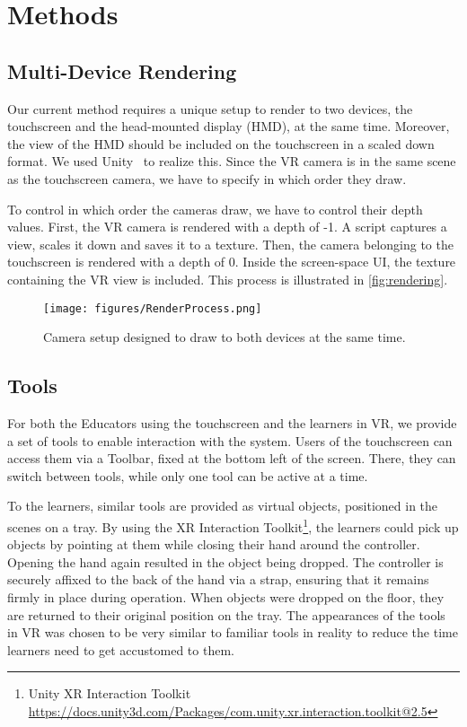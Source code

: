 \section{Methods}

\subsection{Multi-Device Rendering}

Our current method requires a unique setup to render to two devices, the touchscreen and the head-mounted display (HMD), at the same time. Moreover, the view of the HMD should be included on the touchscreen in a scaled down format. We used Unity~\cite{unity} to realize this. Since the VR camera is in the same scene as the touchscreen camera, we have to specify in which order they draw.

To control in which order the cameras draw, we have to control their depth values. First, the VR camera is rendered with a depth of -1. A script captures a view, scales it down and saves it to a texture. Then, the camera belonging to the touchscreen is rendered with a depth of 0. Inside the screen-space UI, the texture containing the VR view is included. This process is illustrated in \autoref{fig:rendering}.

\begin{figure}[tb]
 \centering
 \texttt{[image: figures/RenderProcess.png]}
 \caption{Camera setup designed to draw to both devices at the same time.}
 \label{fig:rendering}
\end{figure}

\subsection{Tools}

For both the Educators using the touchscreen and the learners in VR, we provide a set of tools to enable interaction with the system. Users of the touchscreen can access them via a Toolbar, fixed at the bottom left of the screen. There, they can switch between tools, while only one tool can be active at a time.

To the learners, similar tools are provided as virtual objects, positioned in the scenes on a tray. By using the XR Interaction Toolkit\footnote{Unity XR Interaction Toolkit \url{https://docs.unity3d.com/Packages/com.unity.xr.interaction.toolkit@2.5}}, the learners could pick up objects by pointing at them while closing their hand around the controller. Opening the hand again resulted in the object being dropped. The controller is securely affixed to the back of the hand via a strap, ensuring that it remains firmly in place during operation. When objects were dropped on the floor, they are returned to their original position on the tray. The appearances of the tools in VR was chosen to be very similar to familiar tools in reality to reduce the time learners need to get accustomed to them.


